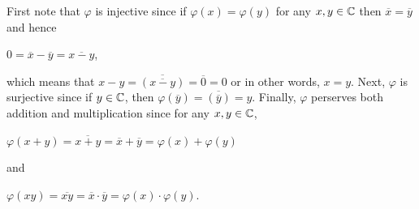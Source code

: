 \documentclass[11pt,fleqn,dvipsnames,usenames]{article}
\begin{document}
\begin{enumerate}
\solution First note that $\varphi$ is injective since if $\varphi(x) = \varphi(y)$ for any $x,y\in\mathbb{C}$ then $\overline{x} = \overline{y}$ and hence
\begin{center}
$0 = \overline{x} - \overline{y} = \overline{x - y}$,
\end{center}
which means that $x - y = \overline{(\overline{x - y})}= \overline{0} = 0$ or in other words, $x = y$.  Next, $\varphi$ is surjective since if $y\in\mathbb{C}$, then $\varphi(\overline{y}) = \overline{(\overline{y})} = y$.  Finally, $\varphi$ perserves both addition and multiplication since for any $x,y\in\mathbb{C}$,
\begin{center}
$\varphi(x + y) = \overline{x + y} = \overline{x}  + \overline{y} = \varphi(x) + \varphi(y)$
\end{center}
and
\begin{center}
$\varphi(xy) = \overline{xy} = \overline{x}\cdot \overline{y} = \varphi(x)\cdot\varphi(y)$.
\end{center}
\end{enumerate}
\end{document}
